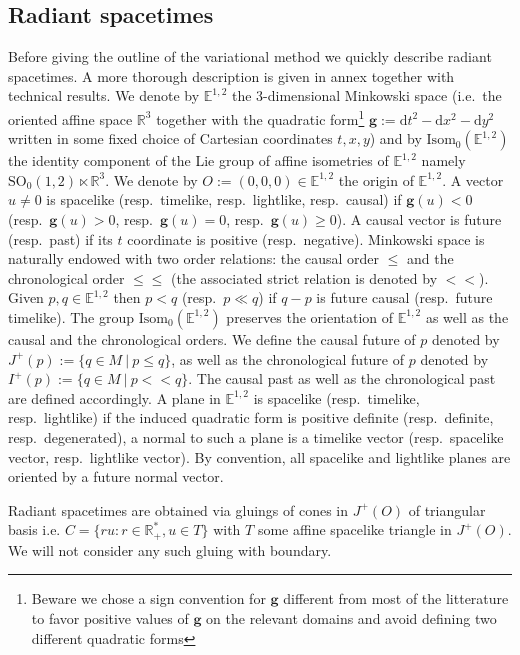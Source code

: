 \documentclass[a4paper,12pt]{article}
\def\chleq{\leq\!\!\!\leq }
\def \chll{<\!\!\!<}
\def\isom{Isom}
\def\d{\mathrm{d}}
\def\SO{\mathrm{SO}}
\def\RR{\mathbb{R}}
\newcommand{\mass}[1]{{\mathbb E}^{1,2}_{#1}}
\def\isom{\mathrm{Isom}}
\def\SO{\mathrm{SO}}
\def\quadform{\mathbf{g}}
\def\isom{\mathrm{Isom}}
\def\d{\mathrm{d}}
\def\GG{\isom_0(\mass{})}
\theoremstyle{definition}
\begin{document}
\subsection{Radiant spacetimes}
		Before giving the outline of the variational method we quickly describe radiant spacetimes. A more thorough description is given in annex together with technical results. We denote by $\mass{}$ the 3-dimensional Minkowski space (i.e.\ the oriented affine space $\RR^3$ together with the quadratic form\footnote{Beware we chose a sign convention for $\quadform$ different from most of the litterature to favor positive values of $\quadform$ on the relevant domains and avoid defining two different quadratic forms} $\quadform:=\d t^2-\d x^2-\d y^2$ written in some fixed choice of Cartesian coordinates $t,x,y$) and by $\GG$ the identity component of the Lie group of affine isometries of $\mass{}$ namely $\SO_0(1,2)\ltimes \RR^3$. We denote by $O:=(0,0,0)\in \mass{}$ the origin of $\mass{}$.
		A vector $u\neq 0$ is spacelike (resp.\ timelike, resp.\ lightlike, resp.\ causal) if $\quadform(u)<0$ (resp.\ $\quadform(u)>0$, resp.\ $\quadform(u)=0$, resp.\ $\quadform(u)\geq 0$). A causal vector is future (resp.\ past) if its $t$ coordinate is positive (resp.\ negative).
		Minkowski space is naturally endowed with two order relations: the causal order $\leq$ and the chronological order $\chleq$ (the associated strict relation is denoted by $\chll$). Given $p,q\in \mass{}$ then $p<q$ (resp.\ $p\ll q$) if $q-p$ is future causal (resp.\ future timelike). The group $\GG$ preserves the orientation of $\mass{}$ as well as the causal and the chronological orders. We define the causal future of $p$ denoted by $J^+(p):= \{q\in M~|~ p \leq q\}$, as well as the chronological future of $p$ denoted by $I^+(p):=\{q\in M~|~ p\chll q\}$. The causal past as well as the chronological past are defined accordingly. 		
		A plane in $\mass{}$ is spacelike (resp.\ timelike, resp.\ lightlike) if the induced quadratic form is positive definite (resp.\ definite, resp.\ degenerated), a normal to such a plane is a timelike vector (resp.\ spacelike vector, resp.\ lightlike vector). By convention, all spacelike and lightlike planes are oriented by a future normal vector.
		
		Radiant spacetimes are obtained via gluings of cones in $J^+(O)$ of triangular basis i.e. $C=\{ru: r\in \RR_+^*, u\in T\}$ with $T$ some affine spacelike triangle in $J^+(O)$. We will not consider any such gluing with boundary. 
		
\end{document}
